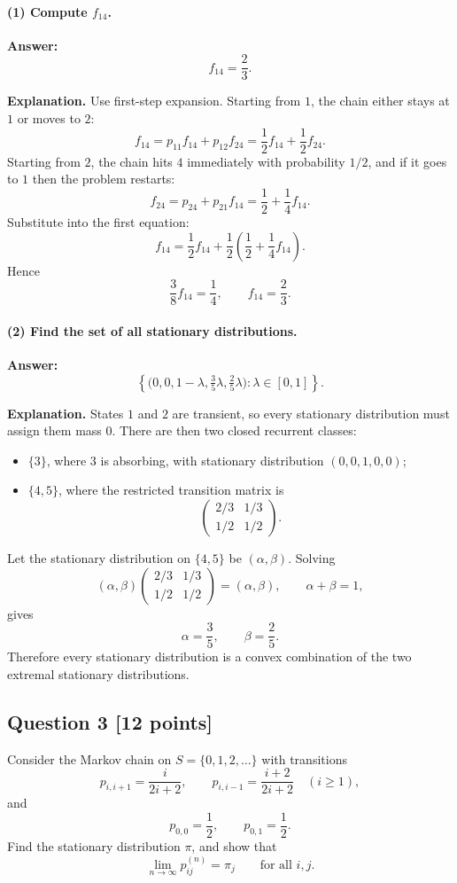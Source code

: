 \documentclass[11pt]{article}
\theoremstyle{definition}
\begin{document}
\paragraph{(1) Compute $f_{14}$.}
\textbf{Answer:}
\[
 f_{14}=\frac23.
\]

\textbf{Explanation.} Use first-step expansion. Starting from $1$, the chain either stays at $1$ or moves to $2$:
\[
 f_{14}=p_{11}f_{14}+p_{12}f_{24} = \frac12 f_{14}+\frac12 f_{24}.
\]
Starting from $2$, the chain hits $4$ immediately with probability $1/2$, and if it goes to $1$ then the problem restarts:
\[
 f_{24}=p_{24}+p_{21}f_{14}=\frac12+\frac14 f_{14}.
\]
Substitute into the first equation:
\[
 f_{14}=\frac12 f_{14}+\frac12\left(\frac12+\frac14 f_{14}\right).
\]
Hence
\[
 \frac38 f_{14}=\frac14,
 \qquad
 f_{14}=\frac23.
\]

\paragraph{(2) Find the set of all stationary distributions.}
\textbf{Answer:}
\[
\left\{
\bigl(0,0,1-\lambda,\tfrac35\lambda,\tfrac25\lambda\bigr): \lambda\in[0,1]
\right\}.
\]

\textbf{Explanation.} States $1$ and $2$ are transient, so every stationary distribution must assign them mass $0$. There are then two closed recurrent classes:
\begin{itemize}[leftmargin=2em]
    \item $\{3\}$, where $3$ is absorbing, with stationary distribution $(0,0,1,0,0)$;
    \item $\{4,5\}$, where the restricted transition matrix is
    \[
    \begin{pmatrix}
    2/3 & 1/3\\
    1/2 & 1/2
    \end{pmatrix}.
    \]
\end{itemize}
Let the stationary distribution on $\{4,5\}$ be $(\alpha,\beta)$. Solving
\[
(\alpha,\beta)
\begin{pmatrix}
2/3 & 1/3\\
1/2 & 1/2
\end{pmatrix}
=(\alpha,\beta),
\qquad
\alpha+\beta=1,
\]
gives
\[
\alpha=\frac35,
\qquad
\beta=\frac25.
\]
Therefore every stationary distribution is a convex combination of the two extremal stationary distributions.

\subsection*{Question 3 \hfill [12 points]}
Consider the Markov chain on $S=\{0,1,2,\dots\}$ with transitions
\[
 p_{i,i+1}=\frac{i}{2i+2},
 \qquad
 p_{i,i-1}=\frac{i+2}{2i+2}
 \quad (i\ge 1),
\]
and
\[
 p_{0,0}=\frac12,
 \qquad
 p_{0,1}=\frac12.
\]
Find the stationary distribution $\pi$, and show that
\[
\lim_{n\to\infty} p_{ij}^{(n)}=\pi_j
\qquad \text{for all } i,j.
\]
\end{document}
